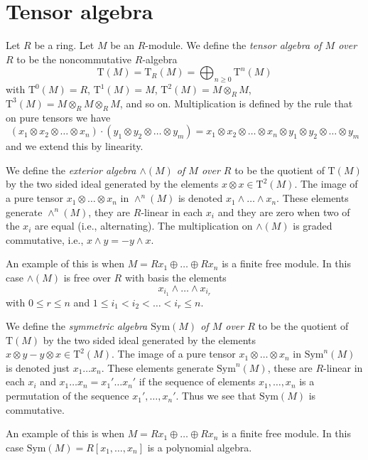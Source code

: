 \section{Tensor algebra}
\label{section-tensor-algebra}

\noindent
Let $R$ be a ring. Let $M$ be an $R$-module.
We define the {\it tensor algebra of $M$ over $R$} to
be the noncommutative $R$-algebra
$$
\text{T}(M) = \text{T}_R(M) =
\bigoplus_{n \geq 0} \text{T}^n(M)
$$
with
$\text{T}^0(M) = R$,
$\text{T}^1(M) = M$,
$\text{T}^2(M) = M \otimes_R M$,
$\text{T}^3(M) = M \otimes_R M \otimes_R M$, and so on.
Multiplication is defined by the rule that on pure tensors we have
$$
(x_1 \otimes x_2 \otimes \ldots \otimes x_n)
\cdot
(y_1 \otimes y_2 \otimes \ldots \otimes y_m)
=
x_1 \otimes x_2 \otimes \ldots \otimes x_n \otimes
y_1 \otimes y_2 \otimes \ldots \otimes y_m
$$
and we extend this by linearity.

\medskip\noindent
We define the {\it exterior algebra $\wedge(M)$ of $M$ over $R$}
to be the quotient of $\text{T}(M)$ by the two sided
ideal generated by the elements $x \otimes x \in \text{T}^2(M)$.
The image of a pure tensor $x_1 \otimes \ldots \otimes x_n$
in $\wedge^n(M)$ is denoted $x_1 \wedge \ldots \wedge x_n$.
These elements generate $\wedge^n(M)$, they are $R$-linear
in each $x_i$ and they are zero when two of the $x_i$ are equal
(i.e., alternating). The multiplication on $\wedge(M)$ is
graded commutative, i.e., $x \wedge y = - y \wedge x$.

\medskip\noindent
An example of this is when $M = Rx_1 \oplus \ldots \oplus Rx_n$
is a finite free module. In this case $\wedge(M)$ is free over
$R$ with basis the elements
$$
x_{i_1} \wedge \ldots \wedge x_{i_r}
$$
with $0 \leq r \leq n$ and $1 \leq i_1 < i_2 < \ldots < i_r \leq n$.

\medskip\noindent
We define the {\it symmetric algebra $\text{Sym}(M)$ of $M$ over $R$}
to be the quotient of $\text{T}(M)$ by the two sided
ideal generated by the elements $x \otimes y - y \otimes x \in \text{T}^2(M)$.
The image of a pure tensor $x_1 \otimes \ldots \otimes x_n$
in $\text{Sym}^n(M)$ is denoted just $x_1 \ldots x_n$.
These elements generate $\text{Sym}^n(M)$, these are $R$-linear
in each $x_i$ and $x_1 \ldots x_n = x_1' \ldots x_n'$ if the
sequence of elements $x_1, \ldots, x_n$ is a permutation of the
sequence $x_1', \ldots, x_n'$. Thus we see that $\text{Sym}(M)$
is commutative.

\medskip\noindent
An example of this is when $M = Rx_1 \oplus \ldots \oplus Rx_n$
is a finite free module. In this case
$\text{Sym}(M) = R[x_1, \ldots, x_n]$ is a polynomial algebra.

